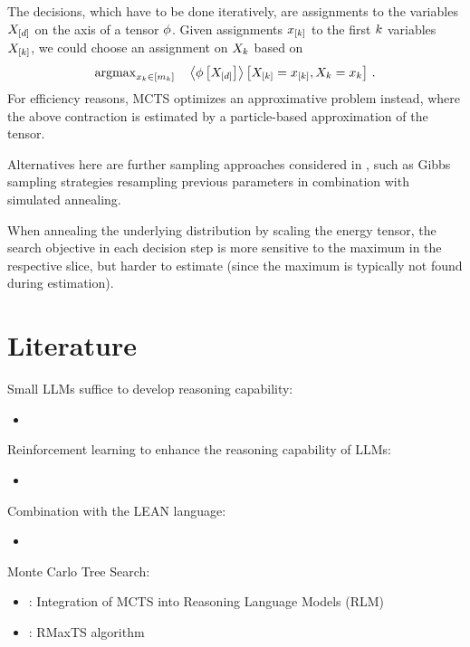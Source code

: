 \documentclass[aps,onecolumn,nofootinbib,pra]{article}
\begin{document}
The decisions, which have to be done iteratively, are assignments to the variables $X_{[d]}$ on the axis of a tensor $\phi$.
Given assignments $x_{[k]}$ to the first $k$ variables $X_{[k]}$, we could choose an assignment on $X_{k}$ based on 
\begin{align*}
	\mathrm{argmax}_{x_{k}\in[m_{k}]} \quad \left\langle \phi\left[X_{[d]}\right]\right\rangle \left[ X_{[k]}=x_{[k]},X_{k}=x_{k} \right] \, .
 \end{align*}
 For efficiency reasons, MCTS optimizes an approximative problem instead, where the above contraction is estimated by a particle-based approximation of the tensor.

Alternatives here are further sampling approaches considered in \tnreason{}, such as Gibbs sampling strategies resampling previous parameters in combination with simulated annealing.

When annealing the underlying distribution by scaling the energy tensor, the search objective in each decision step is more sensitive to the maximum in the respective slice, but harder to estimate (since the maximum is typically not found during estimation).

\section{Literature}

Small LLMs suffice to develop reasoning capability:
\begin{itemize}
	\item \cite{guan_rstar-math_2025}
\end{itemize}

Reinforcement learning to enhance the reasoning capability of LLMs:
\begin{itemize}
	\item \cite{deepseek-ai_deepseek-r1_2025}
\end{itemize}

Combination with the LEAN language:
\begin{itemize}
	\item \cite{xin_deepseek-prover-v15_2024}
\end{itemize}

Monte Carlo Tree Search:
\begin{itemize}
	\item \cite{besta_reasoning_2025}: Integration of MCTS into Reasoning Language Models (RLM)
	\item \cite{xin_deepseek-prover-v15_2024}: RMaxTS algorithm
\end{itemize}




\end{document}
